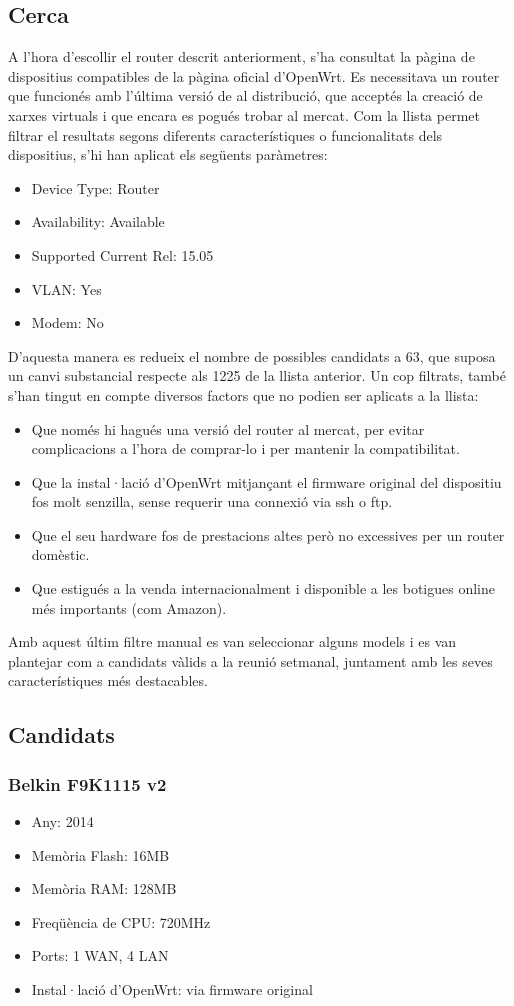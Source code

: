 \documentclass[11pt]{article}
\begin{document}
\subsection{Cerca}
A l’hora d’escollir el router descrit anteriorment, s’ha consultat la pàgina de dispositius compatibles de la pàgina oficial d’OpenWrt\cite{opens16}. Es necessitava un router que funcionés amb l’última versió de al distribució, que acceptés la creació de xarxes virtuals i que encara es pogués trobar al mercat. Com la llista permet filtrar el resultats segons diferents característiques o funcionalitats dels dispositius, s’hi han aplicat els següents paràmetres:
\begin{itemize}
\item Device Type: Router
\item Availability: Available
\item Supported Current Rel: 15.05
\item VLAN: Yes
\item Modem: No
\end{itemize}
D’aquesta manera es redueix el nombre de possibles candidats a 63, que suposa un canvi substancial respecte als 1225 de la llista anterior.
Un cop filtrats, també s’han tingut en compte diversos factors que no podien ser aplicats a la llista:
\begin{itemize}
\item Que només hi hagués una versió del router al mercat, per evitar complicacions a l’hora de comprar-lo i per mantenir la compatibilitat.
\item Que la instal·lació d’OpenWrt mitjançant el firmware original del dispositiu fos molt senzilla, sense requerir una connexió via ssh o ftp.
\item Que el seu hardware fos de prestacions altes però no excessives per un router domèstic.
\item Que estigués a la venda internacionalment i disponible a les botigues online més importants (com Amazon).
\end{itemize}
Amb aquest últim filtre manual es van seleccionar alguns models i es van plantejar com a candidats vàlids a la reunió setmanal, juntament amb les seves característiques més destacables.
\newpage
\subsection{Candidats}
\subsubsection{Belkin F9K1115 v2}
\begin{itemize}
\item Any: 2014
\item Memòria Flash: 16MB
\item Memòria RAM: 128MB
\item Freqüència de CPU: 720MHz
\item Ports: 1 WAN, 4 LAN
\item Instal·lació d’OpenWrt: via firmware original
\end{itemize}
\end{document}

